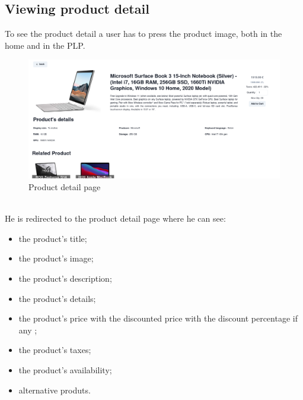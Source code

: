 \subsection{Viewing product detail}
To see the product detail a user has to press the product image, both in the home and in the PLP.
\begin{figure}[!ht]
    \caption{Product detail page}
    \vspace{10px}
    \includegraphics[scale=0.2]{../../../../Images/userManual/PDP.png}
    \centering
\end{figure}
\\
He is redirected to the product detail page where he can see:
\begin{itemize}
    \item the product's title;
    \item the product's image;
    \item the product's description;
    \item the product's details;
    \item the product's price with the discounted price with the discount percentage if any ;
    \item the product's taxes;
    \item the product's availability;
    \item alternative produts.
\end{itemize}
\newpage
